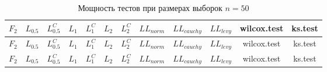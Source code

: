 \documentclass{article}
\begin{document}
\begin{longtable}{|c|c|c|c|c|c|c|c|c|c|c|c|}
  \caption{Мощность тестов при размерах выборок $n=50$}
  \label{table:n50} \\
  \hline
  $F_2$ & $L_{0.5}$ & $L_{0.5}^C$ & $L_{1}$ & $L_{1}^C$ & $L_{2}$ & $L_{2}^C$ & $LL_{norm}$ & $LL_{cauchy}$ & $LL_{levy}$ & wilcox.test & ks.test \\ \hline
  $F_2$ & $L_{0.5}$ & $L_{0.5}^C$ & $L_{1}$ & $L_{1}^C$ & $L_{2}$ & $L_{2}^C$ & $LL_{norm}$ & $LL_{cauchy}$ & $LL_{levy}$ & wilcox.test & ks.test \\ \hline
  $F_2$ & $L_{0.5}$ & $L_{0.5}^C$ & $L_{1}$ & $L_{1}^C$ & $L_{2}$ & $L_{2}^C$ & $LL_{norm}$ & $LL_{cauchy}$ & $LL_{levy}$ & wilcox.test & ks.test \\ \hline
\end{longtable}
\end{document}
